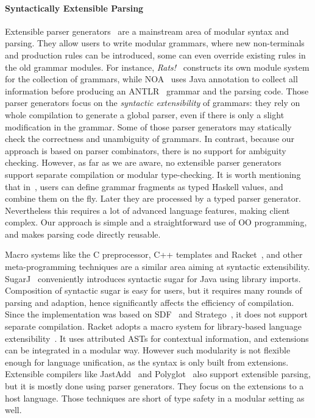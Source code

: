 \paragraph{Syntactically Extensible Parsing}
Extensible parser generators~\cite{antlr1995,Grimm2006,Gouseti2014,Viera2012,Warth2016,schwerdfeger09}
are a mainstream area of modular syntax and parsing. They allow users to write
modular grammars, where new
non-terminals and production rules can be introduced, some can even
override existing rules in the old grammar modules. For instance,
\textit{Rats!}~\cite{Grimm2006} constructs its own module system for
the collection of grammars, while NOA~\cite{Gouseti2014} uses Java
annotation to collect all information before producing an ANTLR~\cite{antlr1995} grammar
and the parsing code. Those parser
generators focus on the \textit{syntactic extensibility} of grammars:
they rely on whole compilation to generate a global parser, even if
there is only a slight modification in the grammar. Some of those
parser generators may statically check the correctness and unambiguity
of grammars. In contrast, because our approach is based on parser
combinators, there is no support for ambiguity checking.  However, as
far as we are aware, no extensible parser generators support separate
compilation or modular type-checking. It is worth mentioning that in~\cite{Viera2012}, users can define
grammar fragments as typed Haskell values, and combine them on the fly. Later they are processed
by a typed parser generator. Nevertheless this requires
a lot of advanced language features, making client complex. Our
approach is simple and a straightforward use of OO programming, 
and makes parsing code directly reusable.

Macro systems like the C preprocessor, C++ templates and
Racket~\cite{Tobin-Hochstadt2011}, and other meta-programming
techniques are a similar area aiming at syntactic extensibility.
SugarJ~\cite{Erdweg2011} conveniently introduces syntactic sugar for
Java using library imports. Composition of syntactic sugar is easy for
users, but it requires many rounds of parsing and adaption, hence
significantly affects the efficiency of compilation. Since the
implementation was based on SDF~\cite{Heering1989} and
Stratego~\cite{Visser2001}, it does not support separate
compilation. Racket adopts a macro system for library-based language
extensibility~\cite{Tobin-Hochstadt2011}. It uses
attributed ASTs for contextual
information, and extensions can be integrated in a modular
way. However such modularity is not flexible enough for language
unification, as the syntax is only built from extensions.
Extensible
compilers like JastAdd~\cite{Ekman2007} and
Polyglot~\cite{Nystrom2003} also support extensible parsing, but it
is mostly done using parser generators. They focus on the
extensions to a host language. Those techniques are short of type safety in a modular
setting as well.

